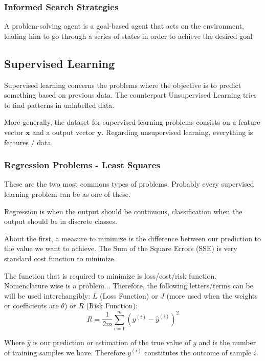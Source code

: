 \subsubsection{Informed Search Strategies}
A problem-solving agent is a goal-based agent that acts on the environment,
leading him to go through a series of states in order to achieve the desired goal




\subsection{Supervised Learning}

Supervised learning concerns the problems where the objective is to predict something based on previous data. The counterpart Unsupervised Learning tries to find patterns in unlabelled data.

More generally, the dataset for supervised learning problems consists on a feature vector $\mathbf{x}$ and a output vector $\mathbf{y}$. Regarding unsupervised learning, everything is features / data.


\subsubsection{Regression Problems - Least Squares}
These are the two most commons types of problems. Probably every supervised learning problem can be  as one of these.

Regression is when the output should be continuous, classification when the output should be in discrete classes. 

About the first, a measure to minimize is the difference between our prediction to the value we want to achieve. The Sum of the Square Errors (SSE) is very standard cost function to minimize.

The function that is required to minimize is loss/cost/risk function. Nomenclature wise is a problem... Therefore, the following letters/terms can be will be used interchangibly: $L$ (Loss Function) or $J$ (more used when the weights or coefficients are $\theta$) or $R$ (Risk Function):
\begin{equation}
    R = \frac{1}{2m} \sum_{i = 1}^m \left(y^{(i)} - \hat{y}^{(i)}\right)^2
\end{equation}

Where $\hat{y}$ is our prediction or estimation of the true value of $y$ and  is the number of training samples we have. Therefore $y^(i)$ constitutes the outcome of sample $i$.

